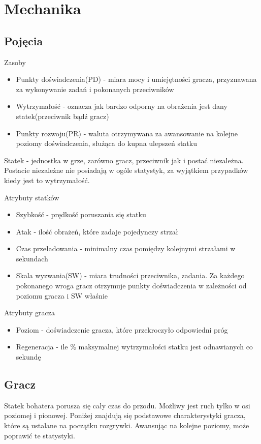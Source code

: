 \chapter{Mechanika}

\section{Pojęcia}

Zasoby
\begin{itemize}
\item{ Punkty doświadczenia(PD) - miara mocy i umiejętności gracza, przyznawana za wykonywanie zadań i pokonanych przeciwników}
\item{Wytrzymałość - oznacza jak bardzo odporny na obrażenia jest dany statek(przeciwnik bądź gracz)}
\item{Punkty rozwoju(PR) - waluta otrzymywana za awansowanie na kolejne poziomy doświadczenia, służąca do kupna ulepszeń statku}
\end{itemize}

Statek - jednostka w grze, zarówno gracz, przeciwnik jak i postać niezależna. Postacie niezależne nie posiadają w ogóle statystyk, za wyjątkiem przypadków kiedy jest to wytrzymałość.

Atrybuty statków
\begin{itemize}
\item{ Szybkość - prędkość poruszania się statku }
\item{Atak - ilość obrażeń, które zadaje pojedynczy strzał}
\item{Czas przeładowania - minimalny czas pomiędzy kolejnymi strzałami w sekundach}
\item{Skala wyzwania(SW) - miara trudności przeciwnika, zadania. Za każdego pokonanego wroga gracz otrzymuje punkty doświadczenia w zależności od poziomu gracza i SW właśnie}
\end{itemize}

Atrybuty gracza
\begin{itemize}
\item{ Poziom - doświadczenie gracza, które przekroczyło odpowiedni próg }
\item{Regeneracja - ile \% maksymalnej wytrzymałości statku jest odnawianych co sekundę}
\end{itemize}


\section{Gracz}
Statek bohatera porusza się cały czas do przodu. Możliwy jest ruch tylko w osi poziomej i pionowej.
Poniżej znajdują się podstawowe charakterystyki gracza, które są ustalane na początku rozgrywki. Awansując na kolejne poziomy, może poprawić te statystyki.

